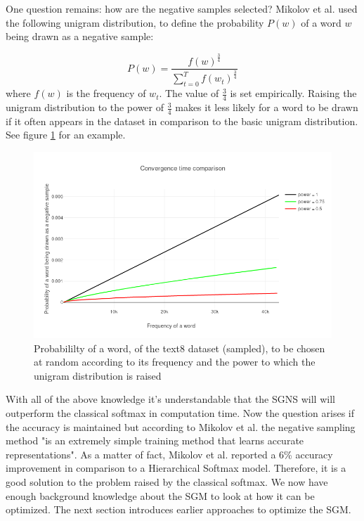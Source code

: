 One question remains: how are the negative samples selected? Mikolov et al. \cite{mikolov2} used the following unigram distribution, to define the probability $P(w)$ of a word $w$ being drawn as a negative sample:

\begin{equation} \label{eq:unigram}
P(w)=\frac{f(w)^{\frac{3}{4}}}{\sum_{t=0}^{T} f(w_t)^{\frac{3}{4}}}
\end{equation}
where $f(w)$ is the frequency of $w_t$. The value of $\frac{3}{4}$ is set empirically. Raising the unigram distribution to the power of $\frac{3}{4}$ makes it less likely for a word to be drawn if it often appears in the dataset in comparison to the basic unigram distribution. See figure \ref{fig:frequency_ex} for an example.\\
\begin{figure}[ht]
\centering
\includegraphics[scale=0.30]{images/frequency_ex}
\caption{Probabililty of a word, of the text8 dataset (sampled), to be chosen at random according to its frequency and the power to which the unigram distribution is raised}
\label{fig:frequency_ex}
\end{figure}
With all of the above knowledge it's understandable that the SGNS will  will outperform the classical softmax in computation time. Now the question arises if the accuracy is maintained but according to Mikolov et al. \cite{mikolov2} the negative sampling method "is an extremely simple training method that learns accurate representations". As a matter of fact, Mikolov et al. \cite{mikolov2} reported a 6\% accuracy improvement in comparison to a Hierarchical Softmax model. Therefore, it is a good solution to the problem raised by the classical softmax.
We now have enough background knowledge about the SGM to look at how it can be optimized. The next section introduces earlier approaches to optimize the SGM.